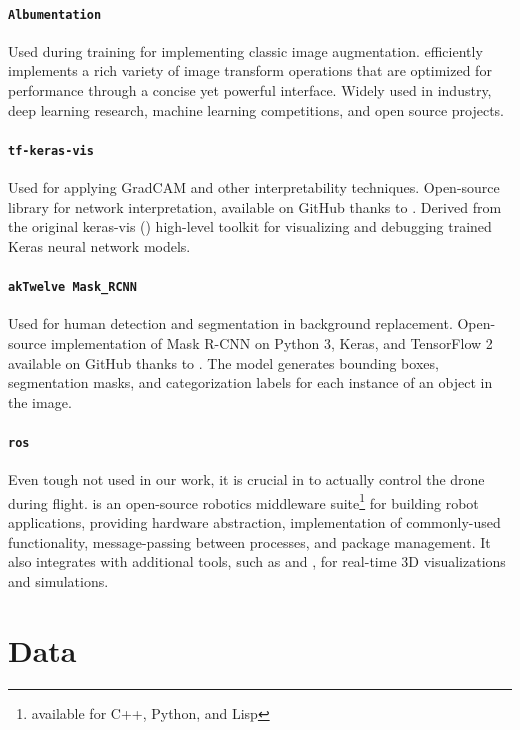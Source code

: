 \paragraph*{\texttt{Albumentation}}
Used during training for implementing classic image augmentation. \cite{albumentations} efficiently implements a rich variety of image transform operations that are optimized for performance through a concise yet powerful interface. Widely used in industry, deep learning research, machine learning competitions, and open source projects.

\paragraph*{\texttt{tf-keras-vis}}
Used for applying GradCAM and other interpretability techniques. Open-source library for network interpretation, available on GitHub thanks to \cite{tf-keras-vis}. Derived from the original keras-vis (\cite{keras-vis}) high-level toolkit for visualizing and debugging trained Keras neural network models.

\paragraph*{\texttt{akTwelve Mask\_RCNN}}
Used for human detection and segmentation in background replacement. Open-source implementation of Mask R-CNN on Python 3, Keras, and TensorFlow 2 available on GitHub thanks to \cite{MaskRCNN_akTwelve}. The model generates bounding boxes, segmentation masks, and categorization labels for each instance of an object in the image.

\paragraph*{\texttt{\gls{ros}}}
Even tough not used in our work, it is crucial in \cite{mantegazza2019visionbased} to actually control the drone during flight. \cite{ROS} is an open-source robotics middleware suite\footnote{available for C++, Python, and Lisp} for building robot applications, providing hardware abstraction, implementation of commonly-used functionality, message-passing between processes, and package management. It also integrates with additional tools, such as \cite{rviz} and \cite{Gazebo}, for real-time 3D visualizations and simulations.




\section{Data}
\label{sec:dataset}

